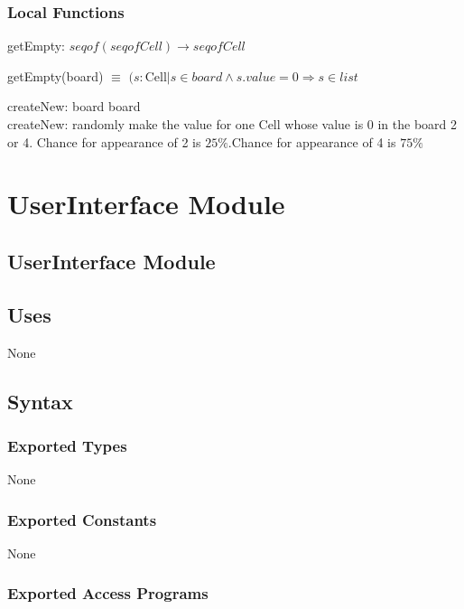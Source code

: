 \documentclass[12pt]{article}
\begin{document}
\subsubsection* {Local Functions}

getEmpty: $seq of (seq of Cell) \rightarrow seq of Cell$ 

\medskip

\noindent getEmpty(board) $\equiv$ ${(s: \text{Cell} | s \in board \wedge s.value = 0 \Rightarrow s \in list}$

\vspace{1.5\baselineskip}

\noindent createNew: board \Rightarrow board \\

\noindent createNew: randomly make the value for one Cell whose value is 0 in the board 2 or 4. Chance for appearance of 2 is $25\%$.Chance for appearance of 4 is $75\%$


\newpage

\section* {UserInterface Module}

\subsection* {UserInterface Module}

\subsection* {Uses}

None

\subsection* {Syntax}

\subsubsection* {Exported Types}

None

\subsubsection* {Exported Constants}

None

\subsubsection* {Exported Access Programs}
\end{document}
